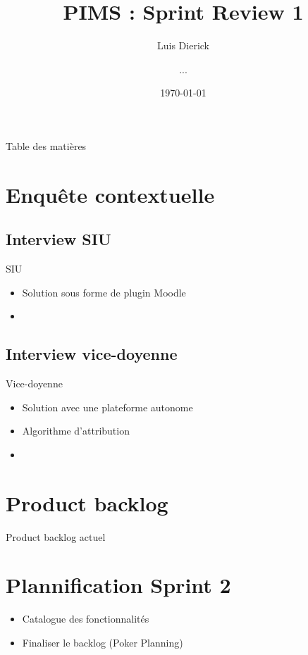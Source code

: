 \documentclass[numbering=fraction]{beamer}
\title{PIMS : Sprint Review 1}
\author[PIMS]{Luis Dierick \and ...}
\institute{Université de Namur}
\date{\today{}}
\begin{document}
\begin{frame}[plain]{}
    \maketitle
\end{frame}

\begin{frame}{Table des matières}
    \tableofcontents
\end{frame}

\section{Enquête contextuelle}
\subsection{Interview SIU}

\begin{frame}{SIU}
    \begin{itemize}
        \item Solution sous forme de plugin Moodle
        \item 
    \end{itemize}
\end{frame}

\subsection{Interview vice-doyenne}

\begin{frame}{Vice-doyenne}
\begin{itemize}
    \item Solution avec une plateforme autonome
    \item Algorithme d'attribution
    \item 
\end{itemize}
\end{frame}

\section{Product backlog}

\begin{frame}{Product backlog actuel}

\end{frame}

\section{Plannification Sprint 2}

\begin{frame}{}
    \begin{itemize}
        \item Catalogue des fonctionnalités
        \item Finaliser le backlog (Poker Planning)
    \end{itemize}
\end{frame}
\end{document}
